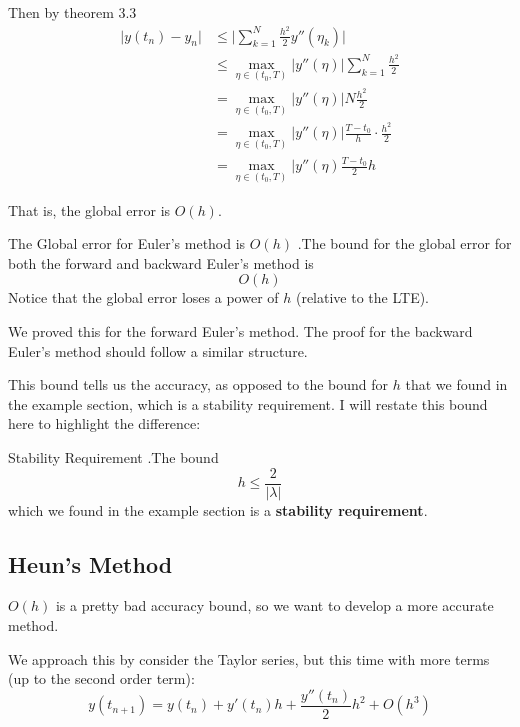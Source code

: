 \documentclass[12pt,letterpaper]{article}
\begin{document}
Then by theorem 3.3
\begin{align}
	\lvert y(t_n) - y_n \rvert &\leq \bigg\lvert \sum_{k=1}^N \frac{h^2}{2} y''(\eta_k) \bigg\rvert  \\
	&\leq \max_{\eta \in (t_0, T)} \lvert y''(\eta) \rvert \sum_{k=1}^N \frac{h^2}{2} \\
	&= \max_{\eta \in (t_0, T)} \lvert y''(\eta) \rvert N \frac{h^2}{2} \\
	&= \max_{\eta \in (t_0, T)} \lvert y''(\eta) \rvert \frac{T - t_0}{h} \cdot \frac{h^2}{2} \\
	&= \max_{\eta \in (t_0, T)} \lvert y''(\eta) \frac{T-t_0}{2} h
\end{align}

That is, the global error is $O(h)$.
\begin{theo}{The Global error for Euler's method is $O(h)$}
.The bound for the global error for both the forward and backward Euler's method is
\begin{equation}
	O(h)
\end{equation}
Notice that the global error loses a power of $h$ (relative to the LTE).
\end{theo}

We proved this for the forward Euler's method. The proof for the backward Euler's method should follow a similar structure.

This bound tells us the accuracy, as opposed to the bound for $h$ that we found in the example section, which is a stability requirement. I will restate this bound here to highlight the difference:

\begin{theo}{Stability Requirement}
.The bound
\begin{equation}
	h \leq \frac{2}{\lvert \lambda \rvert}
\end{equation}
which we found in the example section is a \textbf{stability requirement}.
\end{theo}

\subsection{Heun's Method}

$O(h)$ is a pretty bad accuracy bound, so we want to develop a more accurate method.

We approach this by consider the Taylor series, but this time with more terms (up to the second order term):
\begin{equation} \label{eq:RK_taylor_1}
	y(t_{n+1}) = y(t_n) + y'(t_n) h + \frac{y''(t_n)}{2}h^2 + O(h^3)
\end{equation}
\end{document}
